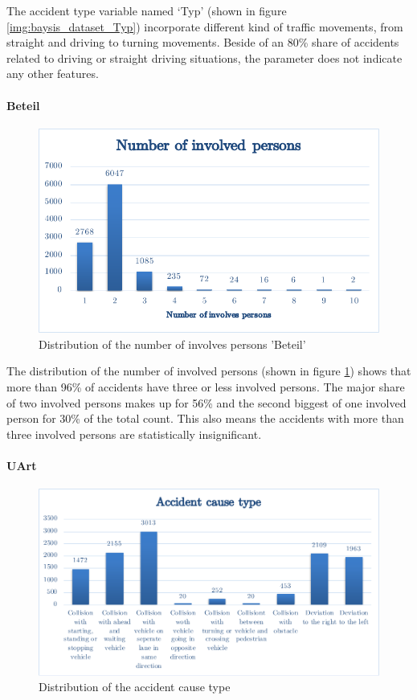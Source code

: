 \documentclass[a4paper,12pt]{report}
\begin{document}
The accident type variable named ‘Typ’ (shown in figure \ref{img:baysis_dataset_Typ}) incorporate different kind of traffic movements, from straight and driving to turning movements. Beside of an 80\% share of accidents related to driving or straight driving situations, the parameter does not indicate any other features.

\paragraph{Beteil}
\begin{figure}[h]
	\centering
	\includegraphics[scale=0.6]{./assets/baysis_dataset_Beteil.pdf}
	\caption{Distribution of the number of involves persons 'Beteil'}
	\label{img:baysis_dataset_Beteil}
\end{figure}

The distribution of the number of involved persons (shown in figure \ref{img:baysis_dataset_Beteil}) shows that more than 96\% of accidents have three or less involved persons. The major share of two involved persons makes up for 56\% and the second biggest of one involved person for 30\% of the total count. This also means the accidents with more than three involved persons are statistically insignificant.

\paragraph{UArt}
\begin{figure}[h]
	\centering
	\includegraphics[scale=0.6]{./assets/baysis_dataset_UArt.pdf}
	\caption{Distribution of the accident cause type}
	\label{img:baysis_dataset_UArt}
\end{figure}
\end{document}
